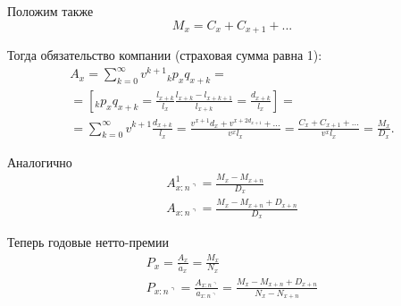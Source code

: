 Положим также 
\[ M_x = C_x + C_{x+1}+...\]

Тогда обязательство компании (страховая сумма равна 1):
\begin{gather*}
	A_x = \sum\limits_{k=0}^{\infty}v^{k+1}{}_kp_xq_{x+k}=\\
	=[{}_kp_xq_{x+k} = \frac{l_{x+k}}{l_x}\frac{l_{x+k}-l_{x+k+1}}{l_{x+k}}=\frac{d_{x+k}}{l_x}]=\\
	= \sum\limits_{k=0}^{\infty}v^{k+1}\frac{d_{x+k}}{l_x} = \frac{v^{x+1}d_x+v^{x+2d_{x+1}}+...}{v^xl_x}=\frac{C_x+C_{x+1}+...}{v^xl_x}=\frac{M_x}{D_x}.
\end{gather*}

Аналогично
\begin{gather*}
	A_{x:n\urcorner}^{1} = \frac{M_x-M_{x+n}}{D_x}\\
	A_{x:n\urcorner} = \frac{M_x-M_{x+n} + D_{x+n}}{D_x}
\end{gather*}

Теперь годовые нетто-премии 
\begin{gather*}
	P_x = \frac{A_x}{\ddot{a}_x}=\frac{M_x}{N_x}\\
	P_{x:n\urcorner}= \frac{A_{x:n\urcorner}}{\ddot{a}_{x:n\urcorner}} = \frac{M_x - M_{x+n}+D_{x+n}}{N_x - N_{x+n}}
\end{gather*}


